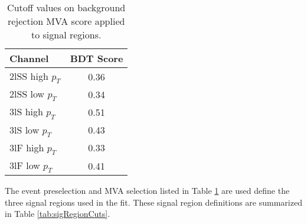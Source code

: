 \begin{table}[H]
  \begin{center}
  \begin{tabular}{l|c}
  \hline\hline
  Channel & BDT Score \\
  \hline
  2lSS high $p_T$ & 0.36 \\
  2lSS low $p_T$ & 0.34 \\
  3lS high $p_T$ & 0.51 \\
  3lS low $p_T$ & 0.43 \\
  3lF high $p_T$ & 0.33 \\
  3lF low $p_T$ & 0.41 \\
  \hline
  \end{tabular}
  \end{center}
  \caption{Cutoff values on background rejection MVA score applied to signal regions.}
  \label{tab:sigBkgCuts}
\end{table}

The event preselection and MVA selection listed in Table \ref{tab:sigBkgCuts} are used define the three signal regions used in the fit. These signal region definitions are summarized in Table \ref{tab:sigRegionCuts}.

